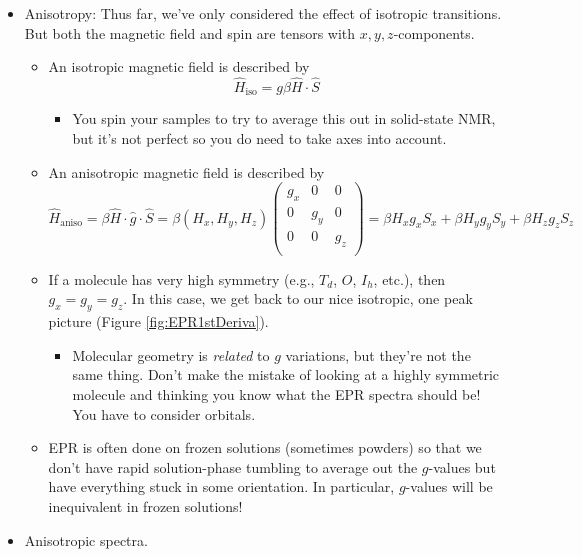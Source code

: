 \documentclass[../notes.tex]{subfiles}
\begin{document}
\begin{itemize}
\begin{itemize}
\begin{itemize}
        \end{itemize}
    \end{itemize}
    \item Anisotropy: Thus far, we've only considered the effect of isotropic transitions. But both the magnetic field and spin are tensors with $x,y,z$-components.
    \begin{itemize}
        \item An isotropic magnetic field is described by
        \begin{equation*}
            \hat{H}_\text{iso} = g\beta\hat{H}\cdot\hat{S}
        \end{equation*}
        \begin{itemize}
            \item You spin your samples to try to average this out in solid-state NMR, but it's not perfect so you do need to take axes into account.
        \end{itemize}
        \item An anisotropic magnetic field is described by
        \begin{equation*}
            \hat{H}_\text{aniso}=\beta\hat{H}\cdot\hat{g}\cdot\hat{S}=\beta(H_x,H_y,H_z)
            \begin{pmatrix}
                g_x & 0 & 0\\
                0 & g_y & 0\\
                0 & 0 & g_z\\
            \end{pmatrix}
            = \beta H_xg_xS_x+\beta H_yg_yS_y+\beta H_zg_zS_z
        \end{equation*}
        \item If a molecule has very high symmetry (e.g., $T_d$, $O$, $I_h$, etc.), then $g_x=g_y=g_z$. In this case, we get back to our nice isotropic, one peak picture (Figure \ref{fig:EPR1stDeriva}).
        \begin{itemize}
            \item Molecular geometry is \emph{related} to $g$ variations, but they're not the same thing. Don't make the mistake of looking at a highly symmetric molecule and thinking you know what the EPR spectra should be! You have to consider orbitals.
        \end{itemize}
        \item EPR is often done on frozen solutions (sometimes powders) so that we don't have rapid solution-phase tumbling to average out the $g$-values but have everything stuck in some orientation. In particular, $g$-values will be inequivalent in frozen solutions!
    \end{itemize}
    \item Anisotropic spectra.
    \begin{figure}[H]
        \centering
        \begin{subfigure}[b]{0.48\linewidth}
            \centering
\end{subfigure}
\end{figure}
\end{itemize}
\end{document}
